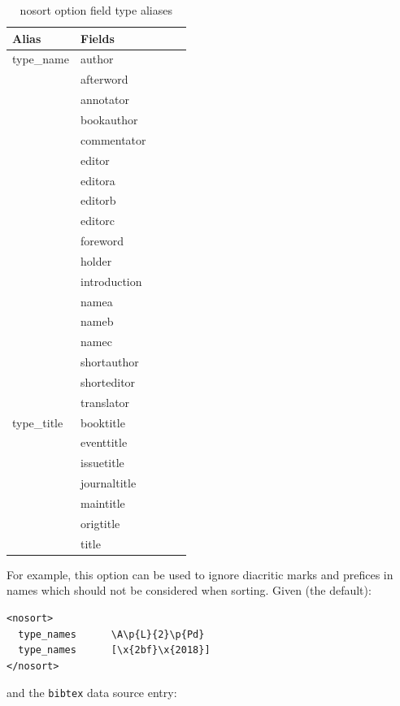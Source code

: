 \documentclass{ltxdockit}
\begin{document}
\begin{table}
\begin{center}
\small
\begin{tabular}{lllll}
\toprule
Alias & Fields\\
\midrule
type\_name & author\\
          & afterword\\
          & annotator\\
          & bookauthor\\
          & commentator\\
          & editor\\
          & editora\\
          & editorb\\
          & editorc\\
          & foreword\\
          & holder\\
          & introduction\\
          & namea\\
          & nameb\\
          & namec\\
          & shortauthor\\
          & shorteditor\\
          & translator\\
type\_title & booktitle\\
           & eventtitle\\
           & issuetitle\\
           & journaltitle\\
           & maintitle\\
           & origtitle\\
           & title\\
\bottomrule
\end{tabular}
\end{center}
\caption{nosort option field type aliases}
\label{tab:nst}
\end{table}

For example, this option can be used to ignore diacritic marks and prefices
in names which should not be considered when sorting. Given (the default):

\begin{verbatim}
<nosort>
  type_names      \A\p{L}{2}\p{Pd}
  type_names      [\x{2bf}\x{2018}]
</nosort>
\end{verbatim}

\noindent and the \verb+bibtex+ data source entry:
\end{document}
